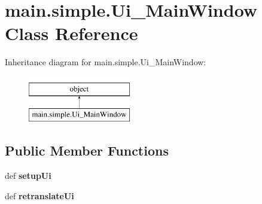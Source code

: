 \hypertarget{classmain_1_1simple_1_1_ui___main_window}{\section{main.\-simple.\-Ui\-\_\-\-Main\-Window Class Reference}
\label{classmain_1_1simple_1_1_ui___main_window}
}
Inheritance diagram for main.\-simple.\-Ui\-\_\-\-Main\-Window\-:\begin{figure}[H]
\begin{center}
\leavevmode
\includegraphics[height=2.000000cm]{classmain_1_1simple_1_1_ui___main_window}
\end{center}
\end{figure}
\subsection*{Public Member Functions}
\begin{DoxyCompactItemize}
\item 
\hypertarget{classmain_1_1simple_1_1_ui___main_window_a9fc239b6f0036e1361503ecfcab4b2c0}{def {\bfseries setup\-Ui}}\label{classmain_1_1simple_1_1_ui___main_window_a9fc239b6f0036e1361503ecfcab4b2c0}

\item 
\hypertarget{classmain_1_1simple_1_1_ui___main_window_a948a84517b1c5315e44efd062573fb75}{def {\bfseries retranslate\-Ui}}\label{classmain_1_1simple_1_1_ui___main_window_a948a84517b1c5315e44efd062573fb75}

\end{DoxyCompactItemize}
